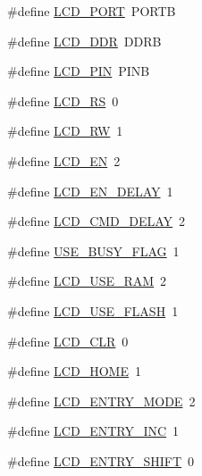 \begin{DoxyCompactItemize}
\item 
\#define \hyperlink{group__ex4__lcd_gabcf42bd88b3c36193f301ca25b033875}{L\-C\-D\-\_\-\-P\-O\-R\-T}~P\-O\-R\-T\-B
\item 
\#define \hyperlink{group__ex4__lcd_ga152b3af754524f57cde037df1d8b7b29}{L\-C\-D\-\_\-\-D\-D\-R}~D\-D\-R\-B
\item 
\#define \hyperlink{group__ex4__lcd_ga43bf5ff1a3bba7fcc6f7ec44d172efe7}{L\-C\-D\-\_\-\-P\-I\-N}~P\-I\-N\-B
\item 
\#define \hyperlink{group__ex4__lcd_ga4781e073871c6f27f89b9463ad3a4ed1}{L\-C\-D\-\_\-\-R\-S}~0
\item 
\#define \hyperlink{group__ex4__lcd_ga26089a10ddd59a0dc7283c19ccc02533}{L\-C\-D\-\_\-\-R\-W}~1
\item 
\#define \hyperlink{group__ex4__lcd_ga1640ffbc0d8ec0f7edb04a2b93918072}{L\-C\-D\-\_\-\-E\-N}~2
\item 
\#define \hyperlink{group__ex4__lcd_ga6afd0d1d228af42a9280d63398fc6e5e}{L\-C\-D\-\_\-\-E\-N\-\_\-\-D\-E\-L\-A\-Y}~1
\item 
\#define \hyperlink{group__ex4__lcd_gabd61e4c479048bc94dc1bd416f1890cd}{L\-C\-D\-\_\-\-C\-M\-D\-\_\-\-D\-E\-L\-A\-Y}~2
\item 
\#define \hyperlink{group__ex4__lcd_ga5105a7b435394f2000811d48ac5144fd}{U\-S\-E\-\_\-\-B\-U\-S\-Y\-\_\-\-F\-L\-A\-G}~1
\item 
\#define \hyperlink{group__ex4__lcd_ga811daed19f02855d3312ef1bff998f2f}{L\-C\-D\-\_\-\-U\-S\-E\-\_\-\-R\-A\-M}~2
\item 
\#define \hyperlink{group__ex4__lcd_ga0883c996256a447970de71ff34d036b1}{L\-C\-D\-\_\-\-U\-S\-E\-\_\-\-F\-L\-A\-S\-H}~1
\item 
\#define \hyperlink{group__ex4__lcd_ga459688213267d13ccfbeb2c9004988cb}{L\-C\-D\-\_\-\-C\-L\-R}~0
\item 
\#define \hyperlink{group__ex4__lcd_gae0e309ccad89222eb3457f2da9f2bb8d}{L\-C\-D\-\_\-\-H\-O\-M\-E}~1
\item 
\#define \hyperlink{group__ex4__lcd_gae5d757ddb6d94de8c82191b60b40e442}{L\-C\-D\-\_\-\-E\-N\-T\-R\-Y\-\_\-\-M\-O\-D\-E}~2
\item 
\#define \hyperlink{group__ex4__lcd_gada766266a0be0d0040fbf86e23b58aa6}{L\-C\-D\-\_\-\-E\-N\-T\-R\-Y\-\_\-\-I\-N\-C}~1
\item 
\#define \hyperlink{group__ex4__lcd_ga14d0c7fda147e0dc8cdaa4a2629b3532}{L\-C\-D\-\_\-\-E\-N\-T\-R\-Y\-\_\-\-S\-H\-I\-F\-T}~0
\item 

\end{DoxyCompactItemize}

